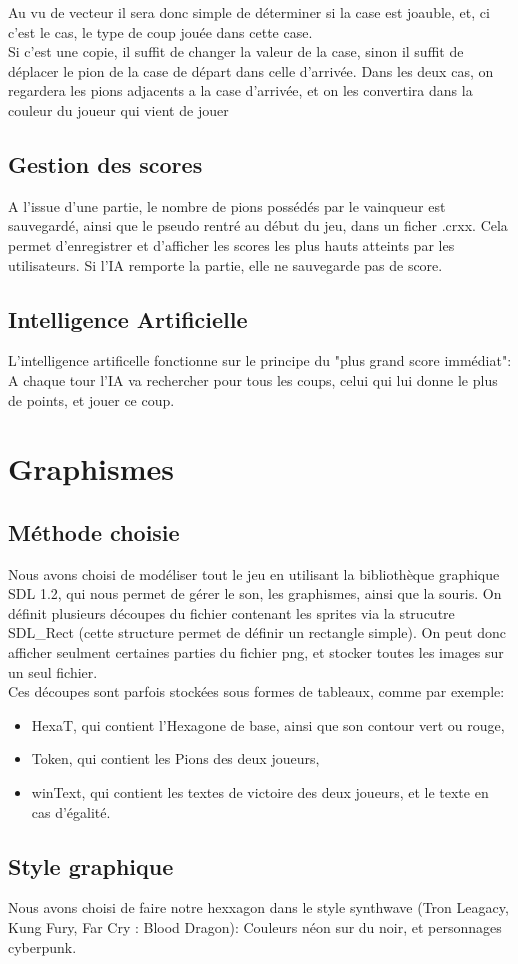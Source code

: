 \documentclass{report}
\begin{document}
	Au vu de vecteur il sera donc simple de déterminer si la case est joauble, et, ci c'est le cas, le type de coup jouée dans cette case.\\
	Si c'est une copie, il suffit de changer la valeur de la case, sinon il suffit de déplacer le pion de la case de départ dans celle d'arrivée. Dans les deux cas, on regardera les pions adjacents a la case d'arrivée, et on les convertira dans la couleur du joueur qui vient de jouer
	\subsection{Gestion des scores}
	
	A l'issue d'une partie, le nombre de pions possédés par le vainqueur est sauvegardé, ainsi que le pseudo rentré au début du jeu, dans un ficher .crxx.
	Cela permet d'enregistrer et d'afficher les scores les plus hauts atteints par les utilisateurs. Si l'IA remporte la partie, elle ne sauvegarde pas de score. 

	\subsection{Intelligence Artificielle}
	
	L'intelligence artificelle fonctionne sur le principe du "plus grand score immédiat": A chaque tour l'IA va rechercher pour tous les coups, celui qui lui donne le plus de points, et jouer ce coup.
	
\newpage
\section{Graphismes}
	\subsection{Méthode choisie}
	
		Nous avons choisi de modéliser tout le jeu en utilisant la bibliothèque graphique SDL 1.2, qui nous permet de gérer le son, les graphismes, ainsi que la souris. On définit plusieurs découpes du fichier contenant les sprites via la strucutre SDL\_Rect (cette structure permet de définir un rectangle simple). On peut donc afficher seulment certaines parties du fichier png, et stocker toutes les images sur un seul fichier.\\
		
		Ces découpes sont parfois stockées sous formes de tableaux, comme par exemple:\begin{itemize}
		\item HexaT, qui contient l'Hexagone de base, ainsi que son contour vert ou rouge,
		\item Token, qui contient les Pions des deux joueurs,
		\item winText, qui contient les textes de victoire des deux joueurs, et le texte en cas d'égalité.
		\end {itemize}
		
	\subsection{Style graphique}
	
		Nous avons choisi de faire notre hexxagon dans le style synthwave (Tron Leagacy, Kung Fury, Far Cry : Blood Dragon): Couleurs néon sur du noir, et personnages cyberpunk.
\end{document}
